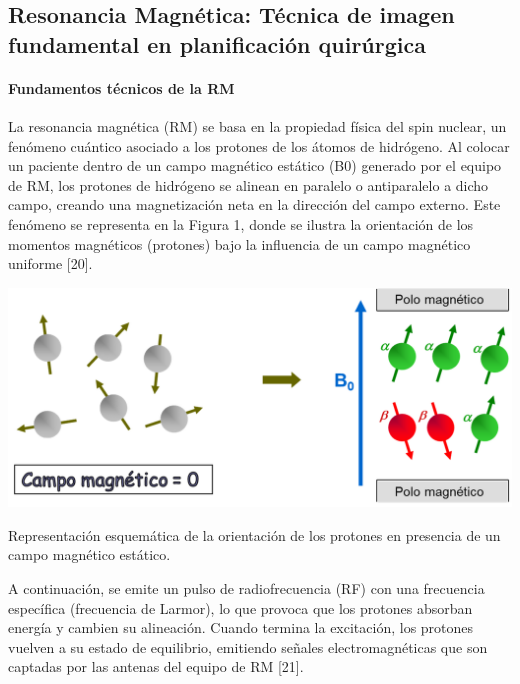 \subsection{Resonancia Magnética: Técnica de imagen fundamental en planificación quirúrgica}
\label{sec:challenges-surgical-planning}


\paragraph{Fundamentos técnicos de la RM} 

La resonancia magnética (RM) se basa en la propiedad física del spin nuclear, un fenómeno cuántico asociado a los protones de los átomos de hidrógeno. Al colocar un paciente dentro de un campo magnético estático (B0) generado por el equipo de RM, los protones de hidrógeno se alinean en paralelo o antiparalelo a dicho campo, creando una magnetización neta en la dirección del campo externo. Este fenómeno se representa en la Figura 1, donde se ilustra la orientación de los momentos magnéticos (protones) bajo la influencia de un campo magnético uniforme [20]. 

\begin{marginfigure}[-6cm]
\includegraphics[width=\linewidth]{imagenes/campomagnetico.png}
\caption{Representación esquemática de la orientación de los protones en presencia de un campo magnético estático.}
\label{fig:Esquema}
\end{marginfigure}

A continuación, se emite un pulso de radiofrecuencia (RF) con una frecuencia específica (frecuencia de Larmor), lo que provoca que los protones absorban energía y cambien su alineación. Cuando termina la excitación, los protones vuelven a su estado de equilibrio, emitiendo señales electromagnéticas que son captadas por las antenas del equipo de RM [21]. 

